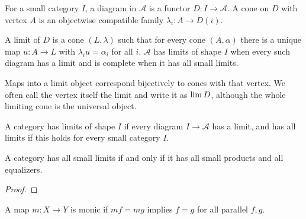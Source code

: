 \begin{definition}
\label{def:lbc-diagram-cone}
For a small category $I$, a diagram in $\mathcal A$ is a functor $D:I\to\mathcal A$.
A cone on $D$ with vertex $A$ is an objectwise compatible family
$\lambda_i:A\to D(i)$.
\end{definition}

\begin{definition}[Limit]
\label{def:lbc-limit}
A limit of $D$ is a cone $(L,\lambda)$ such that for every cone $(A,\alpha)$
there is a unique map $u:A\to L$ with $\lambda_i u=\alpha_i$ for all $i$.
$\mathcal A$ has limits of shape $I$ when every such diagram has a limit and is
complete when it has all small limits.
\end{definition}

\begin{remark}
\label{rem:lbc-limit-notation}
Maps into a limit object correspond bijectively to cones with that vertex. We
often call the vertex itself the limit and write it as $\operatorname{lim} D$, although the
whole limiting cone is the universal object.
\end{remark}

\begin{definition}
\label{def:lbc-has-limits}
A category has limits of shape $I$ if every diagram $I\to\mathcal A$ has a
limit, and has all limits if this holds for every small category $I$.
\end{definition}

\begin{proposition}
\label{prop:lbc-limits-products-equalizers}
A category has all small limits if and only if it has all small products and all
equalizers.
\notready
\end{proposition}
\begin{proof}
\notready
\end{proof}

\begin{definition}[Monomorphism]
\label{def:lbc-monic}
A map $m:X\to Y$ is monic if $mf=mg$ implies $f=g$ for all parallel $f,g$.
\end{definition}

